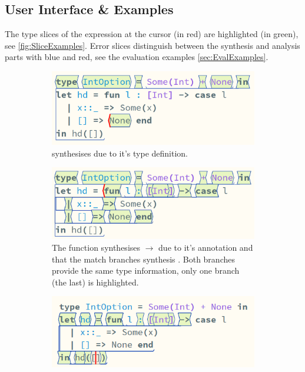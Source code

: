 \subsection{User Interface \& Examples}
The type slices of the expression at the cursor (in red) are highlighted (in green), see \cref{fig:SliceExamples}. Error slices distinguish between the synthesis and analysis parts with blue and red, see the evaluation examples \cref{sec:EvalExamples}.

\begin{figure}[h]
\centering
\begin{subfigure}[t]{0.45\textwidth}
\centering
\includegraphics[width=1\textwidth]{Media/Figures/none_syn}
\caption{ synthesises  due to it's type definition.}
\end{subfigure}
\begin{subfigure}[t]{0.45\textwidth}
\centering
\includegraphics[width=1\textwidth]{Media/Figures/fun_syn}
\caption{The function synthesises \code{[Int]}$\to$  due to it's \code{[Int]} annotation and that the match branches synthesis . Both branches provide the same type information, only one branch (the last) is highlighted.}
\end{subfigure}
\begin{subfigure}[t]{0.45\textwidth}
\centering
\includegraphics[width=1\textwidth]{Media/Figures/list_ana}

\end{subfigure}
\end{figure}
